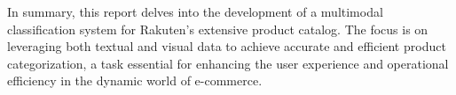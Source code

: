 In summary, this report delves into the development of a multimodal classification system for Rakuten's extensive product catalog. The focus is on leveraging both textual and visual data to achieve accurate and efficient product categorization, a task essential for enhancing the user experience and operational efficiency in the dynamic world of e-commerce.





